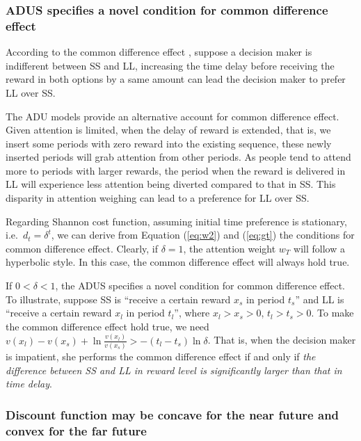 \documentclass[
  12pt,
]{article}
\begin{document}
\hypertarget{adus-specifies-a-novel-condition-for-common-difference-effect}{%
\subsubsection{ADUS specifies a novel condition for common difference
effect}\label{adus-specifies-a-novel-condition-for-common-difference-effect}}

According to the common difference effect
\citep{loewenstein_anomalies_1992}, suppose a decision maker is
indifferent between SS and LL, increasing the time delay before
receiving the reward in both options by a same amount can lead the
decision maker to prefer LL over SS.

The ADU models provide an alternative account for common difference
effect. Given attention is limited, when the delay of reward is
extended, that is, we insert some periods with zero reward into the
existing sequence, these newly inserted periods will grab attention from
other periods. As people tend to attend more to periods with larger
rewards, the period when the reward is delivered in LL will experience
less attention being diverted compared to that in SS. This disparity in
attention weighing can lead to a preference for LL over SS.

Regarding Shannon cost function, assuming initial time preference is
stationary, i.e.~\(d_t=\delta^t\), we can derive from Equation
(\ref{eq:w2}) and (\ref{eq:gt}) the conditions for common difference
effect. Clearly, if \(\delta=1\), the attention weight \(w_T\) will
follow a hyperbolic style. In this case, the common difference effect
will always hold true.

If \(0<\delta<1\), the ADUS specifies a novel condition for common
difference effect. To illustrate, suppose SS is ``receive a certain
reward \(x_s\) in period \(t_s\)'' and LL is ``receive a certain reward
\(x_l\) in period \(t_l\)'', where \(x_l>x_s>0\), \(t_l>t_s>0\). To make
the common difference effect hold true, we need
\(v(x_l)-v(x_s)+\ln\frac{v(x_l)}{v(x_s)}>-(t_l-t_s)\ln\delta\). That is,
when the decision maker is impatient, she performs the common difference
effect if and only if \emph{the difference between SS and LL in reward
level is significantly larger than that in time delay}.

\hypertarget{discount-function-may-be-concave-for-the-near-future-and-convex-for-the-far-future}{%
\subsubsection{Discount function may be concave for the near future and
convex for the far
future}\label{discount-function-may-be-concave-for-the-near-future-and-convex-for-the-far-future}}
\end{document}
